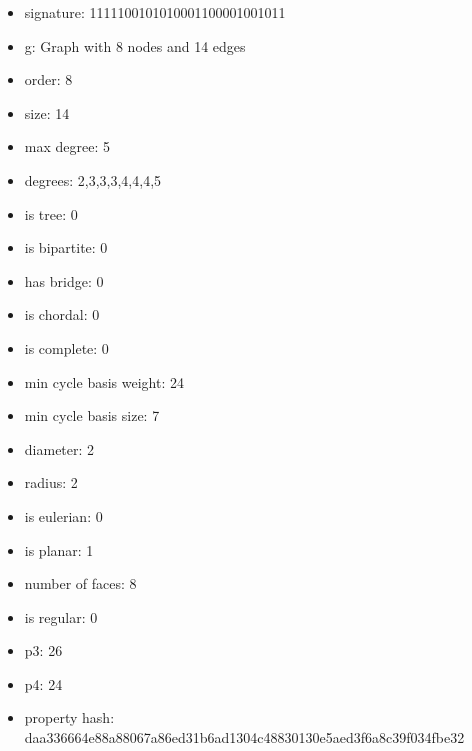 \begin{itemize}
\item signature: 1111100101010001100001001011
\item g: Graph with 8 nodes and 14 edges
\item order: 8
\item size: 14
\item max degree: 5
\item degrees: 2,3,3,3,4,4,4,5
\item is tree: 0
\item is bipartite: 0
\item has bridge: 0
\item is chordal: 0
\item is complete: 0
\item min cycle basis weight: 24
\item min cycle basis size: 7
\item diameter: 2
\item radius: 2
\item is eulerian: 0
\item is planar: 1
\item number of faces: 8
\item is regular: 0
\item p3: 26
\item p4: 24
\item property hash: daa336664e88a88067a86ed31b6ad1304c48830130e5aed3f6a8c39f034fbe32
\end{itemize}
\newpage
\begin{figure}
\end{figure}
